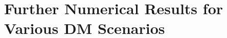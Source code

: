 \documentclass[11pt,a4paper]{article}
\begin{document}



\section{Further Numerical Results for Various DM Scenarios}
\label{app:number}
\end{document}
